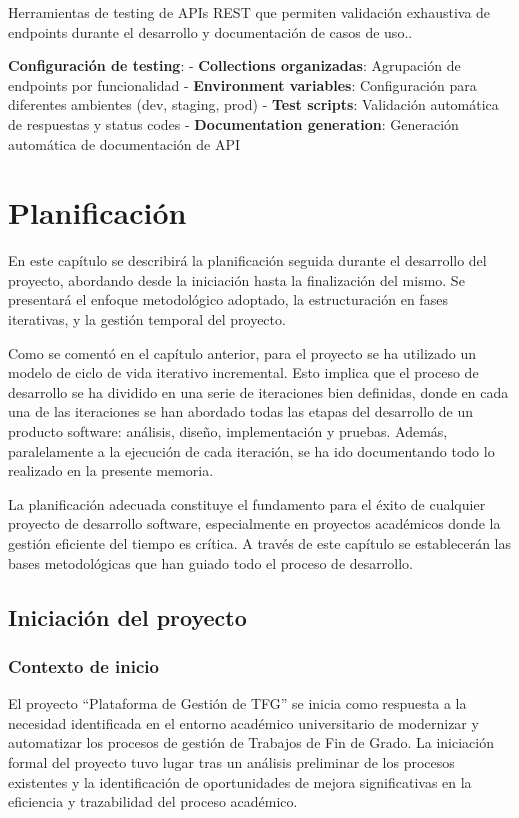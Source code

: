 \documentclass[12pt,a4paper,oneside]{report}
\begin{document}
Herramientas de testing de APIs REST que permiten validación exhaustiva
de endpoints durante el desarrollo y documentación de casos de uso..

\textbf{Configuración de testing}: - \textbf{Collections organizadas}:
Agrupación de endpoints por funcionalidad - \textbf{Environment
variables}: Configuración para diferentes ambientes (dev, staging, prod)
- \textbf{Test scripts}: Validación automática de respuestas y status
codes - \textbf{Documentation generation}: Generación automática de
documentación de API

\chapter{Planificación}\label{planificaciuxf3n}

En este capítulo se describirá la planificación seguida durante el
desarrollo del proyecto, abordando desde la iniciación hasta la
finalización del mismo. Se presentará el enfoque metodológico adoptado,
la estructuración en fases iterativas, y la gestión temporal del
proyecto.

Como se comentó en el capítulo anterior, para el proyecto se ha
utilizado un modelo de ciclo de vida iterativo incremental. Esto implica
que el proceso de desarrollo se ha dividido en una serie de iteraciones
bien definidas, donde en cada una de las iteraciones se han abordado
todas las etapas del desarrollo de un producto software: análisis,
diseño, implementación y pruebas. Además, paralelamente a la ejecución
de cada iteración, se ha ido documentando todo lo realizado en la
presente memoria.

La planificación adecuada constituye el fundamento para el éxito de
cualquier proyecto de desarrollo software, especialmente en proyectos
académicos donde la gestión eficiente del tiempo es crítica. A través de
este capítulo se establecerán las bases metodológicas que han guiado
todo el proceso de desarrollo.

\section{Iniciación del proyecto}\label{iniciaciuxf3n-del-proyecto}

\subsection{Contexto de inicio}\label{contexto-de-inicio}

El proyecto ``Plataforma de Gestión de TFG'' se inicia como respuesta a
la necesidad identificada en el entorno académico universitario de
modernizar y automatizar los procesos de gestión de Trabajos de Fin de
Grado. La iniciación formal del proyecto tuvo lugar tras un análisis
preliminar de los procesos existentes y la identificación de
oportunidades de mejora significativas en la eficiencia y trazabilidad
del proceso académico.
\end{document}
